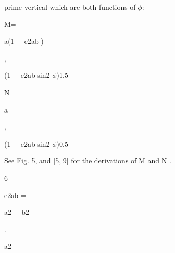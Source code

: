 \documentclass[a4paper,portrait,12pt]{article}
\begin{document}
\begin{flushleft}
prime vertical which are both functions of $\phi$:
\end{flushleft}


\begin{flushleft}
M=
\end{flushleft}





\begin{flushleft}
a(1 $-$ e2ab )
\end{flushleft}


,


\begin{flushleft}
(1 $-$ e2ab sin2 $\phi$)1.5
\end{flushleft}





\begin{flushleft}
N=
\end{flushleft}





\begin{flushleft}
a
\end{flushleft}


,


\begin{flushleft}
(1 $-$ e2ab sin2 $\phi$)0.5
\end{flushleft}





\begin{flushleft}
See Fig. 5, and [5, 9] for the derivations of M and N .
\end{flushleft}


6





\begin{flushleft}
e2ab =
\end{flushleft}





\begin{flushleft}
a2 $-$ b2
\end{flushleft}


.


\begin{flushleft}
a2
\end{flushleft}
\end{document}
